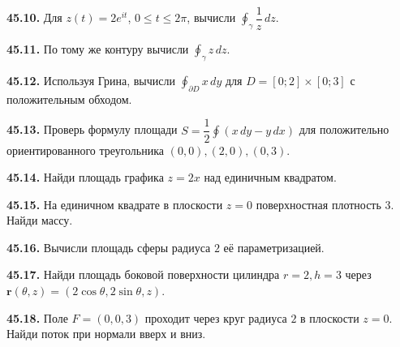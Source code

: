 \noindent\begin{minipage}[t]{\linewidth}\textbf{45.10.} Для \(z(t)=2e^{it}\), \(0\le t\le2\pi\), вычисли \(\oint_\gamma\dfrac1z\,dz\).\par\end{minipage}\par
\noindent\begin{minipage}[t]{\linewidth}\textbf{45.11.} По тому же контуру вычисли \(\oint_\gamma z\,dz\).\par\end{minipage}\par
\noindent\begin{minipage}[t]{\linewidth}\textbf{45.12.} Используя Грина, вычисли \(\oint_{\partial D}x\,dy\) для \(D=[0;2]\times[0;3]\) с положительным обходом.\par\end{minipage}\par
\noindent\begin{minipage}[t]{\linewidth}\textbf{45.13.} Проверь формулу площади \(S=\dfrac12\oint(x\,dy-y\,dx)\) для положительно ориентированного треугольника \((0,0),(2,0),(0,3)\).\par\end{minipage}\par
\noindent\begin{minipage}[t]{\linewidth}\textbf{45.14.} Найди площадь графика \(z=2x\) над единичным квадратом.\par\end{minipage}\par
\noindent\begin{minipage}[t]{\linewidth}\textbf{45.15.} На единичном квадрате в плоскости \(z=0\) поверхностная плотность \(3\). Найди массу.\par\end{minipage}\par
\noindent\begin{minipage}[t]{\linewidth}\textbf{45.16.} Вычисли площадь сферы радиуса \(2\) её параметризацией.\par\end{minipage}\par
\noindent\begin{minipage}[t]{\linewidth}\textbf{45.17.} Найди площадь боковой поверхности цилиндра \(r=2,h=3\) через \(\symbf r(\theta,z)=(2\cos\theta,2\sin\theta,z)\).\par\end{minipage}\par
\noindent\begin{minipage}[t]{\linewidth}\textbf{45.18.} Поле \(F=(0,0,3)\) проходит через круг радиуса \(2\) в плоскости \(z=0\). Найди поток при нормали вверх и вниз.\par\end{minipage}\par
